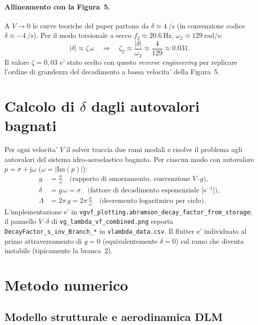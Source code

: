 \documentclass[11pt,a4paper]{article}
\begin{document}
\paragraph{Allineamento con la Figura~5.}
A $V\to 0$ le curve teoriche del paper partono da
$\delta\approx\SI{4}{\per\second}$ (in convenzione codice $\delta\approx\SI{-4}{\per\second}$).
Per il modo torsionale a secco $f_2\approx\SI{20.6}{\hertz}$,
$\omega_2\approx\SI{129}{\radian\per\second}$:
\[
  |\delta| \approx \zeta\,\omega
  \quad\Rightarrow\quad
  \zeta_2 \approx \frac{|\delta|}{\omega_2}
  \approx \frac{4}{129} \approx 0.031.
\]
Il valore $\zeta=0{,}03$ e' stato scelto con questo \emph{reverse engineering} per
replicare l'ordine di grandezza del decadimento a bassa velocita' della Figura~5.

\section{Calcolo di $\delta$ dagli autovalori bagnati}
\label{sec:delta}

Per ogni velocita' $V$ il solver traccia due rami modali e risolve il problema
agli autovalori del sistema idro-aeroelastico bagnato. Per ciascun modo
con autovalore $p=\sigma+\mathrm{j}\omega$ ($\omega=|\mathrm{Im}(p)|$):
\begin{align}
  g &= \frac{\sigma}{\omega}
  \quad\text{(rapporto di smorzamento, convenzione $V$--$g$)}, \\
  \delta &= g\,\omega = \sigma
  \quad\text{(fattore di decadimento esponenziale [s$^{-1}$])}, \\
  \Lambda &= 2\pi\,g = 2\pi\,\frac{\sigma}{\omega}
  \quad\text{(decremento logaritmico per ciclo).}
\end{align}
L'implementazione e' in \texttt{vgvf\_plotting.abramson\_decay\_factor\_from\_storage};
il pannello $V$--$\delta$ di \texttt{vg\_lambda\_vf\_combined.png} esporta
\texttt{DecayFactor\_s\_inv\_Branch\_*} in \texttt{vlambda\_data.csv}.
Il flutter e' individuato al primo attraversamento di $g=0$ (equivalentemente $\delta=0$)
sul ramo che diventa instabile (tipicamente la branca~2).

\section{Metodo numerico}
\label{sec:metodo-numerico}

\subsection{Modello strutturale e aerodinamica DLM}
\end{document}
